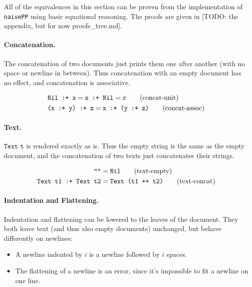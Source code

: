 \documentclass{article}
\newcommand{\cat}[2]{\texttt{#1 :+ #2}}
\newcommand{\txt}[1]{\texttt{Text #1}}
\newcommand{\nil}{\texttt{Nil}}
\newcommand{\code}[1]{\texttt{#1}}
\begin{document}
All of the equivalences in this section can be proven from the implementation of \code{naivePP} using
basic equational reasoning. The proofs are given in [TODO: the appendix, but for now proofs\_tree.md].

\paragraph{Concatenation.}
The concatenation of two documents just prints them one after another (with no space or newline in
between). Thus concatenation with an empty document has no effect, and concatenation is associative.

\begin{align*}
  &\cat{\nil}{x} = \cat{x}{\nil} = x \tag{concat-unit} \\
  &\cat{(\cat{x}{y})}{z} = \cat{x}{(\cat{y}{z})} \tag{concat-assoc}
\end{align*}

\paragraph{Text.}
$\txt{t}$ is rendered exactly as is. Thus the empty string is the same as the empty document, and
the concatenation of two texts just concatenates their strings.

\begin{align*}
  \code{""} &= \nil \tag{text-empty} \\
  \cat{\txt{t1}}{\txt{t2}} &= \txt{(t1 ++ t2)} \tag{text-concat}
\end{align*}

\paragraph{Indentation and Flattening.}
Indentation and flattening can be lowered to the leaves of the document.  They both leave text (and
thus also empty documents) unchanged, but behave differently on newlines:
\begin{itemize}
\item A newline indented by $i$ is a newline followed by $i$ spaces.
\item The flattening of a newline is an error, since it's impossible to fit a newline on one line.
\end{itemize}
\end{document}
